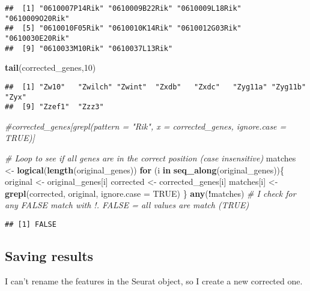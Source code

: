 \documentclass[
]{article}
\newenvironment{Shaded}{\begin{snugshade}}{\end{snugshade}}
\newcommand{\AttributeTok}[1]{\textcolor[rgb]{0.13,0.29,0.53}{#1}}
\newcommand{\CommentTok}[1]{\textcolor[rgb]{0.56,0.35,0.01}{\textit{#1}}}
\newcommand{\ConstantTok}[1]{\textcolor[rgb]{0.56,0.35,0.01}{#1}}
\newcommand{\ControlFlowTok}[1]{\textcolor[rgb]{0.13,0.29,0.53}{\textbf{#1}}}
\newcommand{\DecValTok}[1]{\textcolor[rgb]{0.00,0.00,0.81}{#1}}
\newcommand{\FunctionTok}[1]{\textcolor[rgb]{0.13,0.29,0.53}{\textbf{#1}}}
\newcommand{\NormalTok}[1]{#1}
\newcommand{\OtherTok}[1]{\textcolor[rgb]{0.56,0.35,0.01}{#1}}
\newcommand{\SpecialCharTok}[1]{\textcolor[rgb]{0.81,0.36,0.00}{\textbf{#1}}}
\begin{document}
\begin{verbatim}
##  [1] "0610007P14Rik" "0610009B22Rik" "0610009L18Rik" "0610009O20Rik"
##  [5] "0610010F05Rik" "0610010K14Rik" "0610012G03Rik" "0610030E20Rik"
##  [9] "0610033M10Rik" "0610037L13Rik"
\end{verbatim}

\begin{Shaded}
\begin{Highlighting}[]
\FunctionTok{tail}\NormalTok{(corrected\_genes,}\DecValTok{10}\NormalTok{)}
\end{Highlighting}
\end{Shaded}

\begin{verbatim}
##  [1] "Zw10"   "Zwilch" "Zwint"  "Zxdb"   "Zxdc"   "Zyg11a" "Zyg11b" "Zyx"   
##  [9] "Zzef1"  "Zzz3"
\end{verbatim}

\begin{Shaded}
\begin{Highlighting}[]
\CommentTok{\#corrected\_genes[grepl(pattern = "Rik", x = corrected\_genes, ignore.case = TRUE)]}

\CommentTok{\# Loop to see if all genes are in the correct position (case insensitive)}
\NormalTok{matches }\OtherTok{\textless{}{-}} \FunctionTok{logical}\NormalTok{(}\FunctionTok{length}\NormalTok{(original\_genes))}
\ControlFlowTok{for}\NormalTok{ (i }\ControlFlowTok{in} \FunctionTok{seq\_along}\NormalTok{(original\_genes))\{}
\NormalTok{  original }\OtherTok{\textless{}{-}}\NormalTok{ original\_genes[i]}
\NormalTok{  corrected }\OtherTok{\textless{}{-}}\NormalTok{ corrected\_genes[i]}
\NormalTok{  matches[i] }\OtherTok{\textless{}{-}} \FunctionTok{grepl}\NormalTok{(corrected, original, }\AttributeTok{ignore.case =} \ConstantTok{TRUE}\NormalTok{)}
\NormalTok{\}}
\FunctionTok{any}\NormalTok{(}\SpecialCharTok{!}\NormalTok{matches) }\CommentTok{\# I check for any FALSE match with !. FALSE = all values are match (TRUE)}
\end{Highlighting}
\end{Shaded}

\begin{verbatim}
## [1] FALSE
\end{verbatim}

\subsection{Saving results}\label{saving-results}

I can't rename the features in the Seurat object, so I create a new
corrected one.
\end{document}
